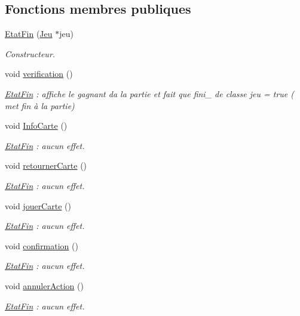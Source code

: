 \subsection*{Fonctions membres publiques}
\begin{DoxyCompactItemize}
\item 
\hyperlink{class_etat_fin_af6be08aa8a5e548075be8227d3b88523}{Etat\-Fin} (\hyperlink{class_jeu}{Jeu} $\ast$jeu)
\begin{DoxyCompactList}\small\item\em Constructeur. \end{DoxyCompactList}\item 
void \hyperlink{class_etat_fin_af5b612f37d0d38878b7380c7c44c8373}{verification} ()
\begin{DoxyCompactList}\small\item\em \hyperlink{class_etat_fin}{Etat\-Fin} \-: affiche le gagnant da la partie et fait que fini\-\_\- de classe jeu = true ( met fin à la partie) \end{DoxyCompactList}\item 
void \hyperlink{class_etat_fin_a60377a6cd48de413cb14445f8e9683bb}{Info\-Carte} ()
\begin{DoxyCompactList}\small\item\em \hyperlink{class_etat_fin}{Etat\-Fin} \-: aucun effet. \end{DoxyCompactList}\item 
void \hyperlink{class_etat_fin_a7772020d9101b4ebac666c498f023215}{retourner\-Carte} ()
\begin{DoxyCompactList}\small\item\em \hyperlink{class_etat_fin}{Etat\-Fin} \-: aucun effet. \end{DoxyCompactList}\item 
void \hyperlink{class_etat_fin_a8120a04c2f2e3632683a79a6b2fd524a}{jouer\-Carte} ()
\begin{DoxyCompactList}\small\item\em \hyperlink{class_etat_fin}{Etat\-Fin} \-: aucun effet. \end{DoxyCompactList}\item 
void \hyperlink{class_etat_fin_a218360ae56a421d500329f53c893822e}{confirmation} ()
\begin{DoxyCompactList}\small\item\em \hyperlink{class_etat_fin}{Etat\-Fin} \-: aucun effet. \end{DoxyCompactList}\item 
void \hyperlink{class_etat_fin_aa1ec559bd55dce76286b32b4cb293857}{annuler\-Action} ()
\begin{DoxyCompactList}\small\item\em \hyperlink{class_etat_fin}{Etat\-Fin} \-: aucun effet. \end{DoxyCompactList}\end{DoxyCompactItemize}


